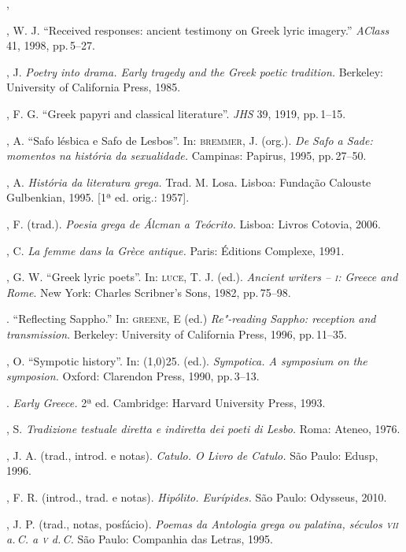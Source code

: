 \begin{bibliohedra}
, 

, W. J. ``Received responses: ancient testimony on Greek lyric imagery.'' 
\emph{AClass} 41, 1998, pp.\,5--27. 

, J. \emph{Poetry into drama. Early tragedy and the Greek
poetic tradition.} Berkeley: University of California Press, 1985.

, F. G. “Greek papyri and classical literature”.
\emph{JHS} 39, 1919, pp.\,1--15.

, A. “Safo lésbica e Safo de Lesbos”. In: \textsc{bremmer}, J.
(org.). \emph{De Safo a Sade: momentos na história da sexualidade.} Campinas:
Papirus, 1995, pp.\,27--50.

, A. \emph{História da literatura grega.} Trad. M. Losa. Lisboa:
Fundação Calouste Gulbenkian, 1995. {[}1ª ed. orig.: 1957{]}.

, F. (trad.). \emph{Poesia grega de Álcman a Teócrito.}
Lisboa: Livros Cotovia, 2006.

, C. \emph{La femme dans la Grèce antique.} Paris: Éditions
Complexe, 1991.

, G. W. “Greek lyric poets”. In: \textsc{luce}, T. J. (ed.). \emph{Ancient writers -- \textsc{i}: Greece and Rome}. New York: Charles Scribner's Sons, 1982, pp.\,75--98. 

\titidem. ``Reflecting Sappho.'' In: \textsc{greene}, E (ed.) 
\emph{Re"-reading Sappho: reception and transmission}. Berkeley: University of California Press,
1996, pp.\,11--35.

, O. “Sympotic history”. In: \line(1,0){25}. (ed.).
\emph{Sympotica. A symposium on the symposion.} Oxford: Clarendon Press,
1990, pp.\,3--13.

\titidem. \emph{Early Greece.} 2ª ed.
Cambridge: Harvard University Press, 1993.

, S. \emph{Tradizione testuale diretta e indiretta dei poeti
di Lesbo.} Roma: Ateneo, 1976. 

, J. A. (trad., introd. e notas). \emph{Catulo. O Livro de
Catulo.} São Paulo: Edusp, 1996.

, F. R. (introd., trad. e notas). \emph{Hipólito. Eurípides.}
São Paulo: Odysseus, 2010.

, J. P. (trad., notas, posfácio). \emph{Poemas da Antologia grega
ou palatina, séculos \textsc{vii} a.\,C. a \textsc{v} d.\,C.} São Paulo: Companhia das Letras, 1995.


\end{bibliohedra}
